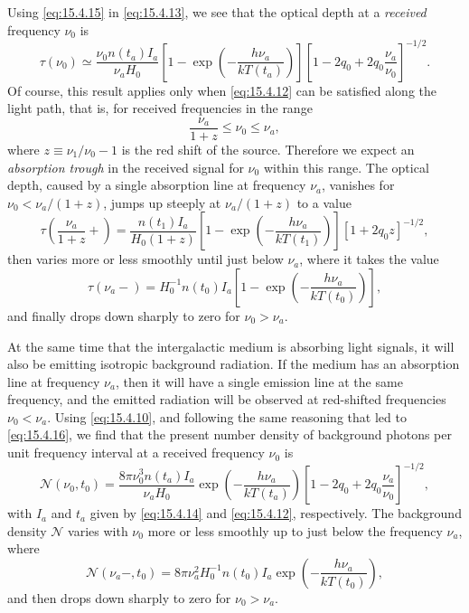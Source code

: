 Using \eqref{eq:15.4.15} in \eqref{eq:15.4.13}, we see that the optical
depth at a \emph{received} frequency \(\nu_0\) is
\begin{equation}
  \tau(\nu_0)
  \simeq
  \frac{\nu_0n(t_a)I_a}{\nu_aH_0}
  \left[
    1-\exp\left(-\frac{h\nu_a}{kT(t_a)}\right)
  \right]
  \left[
    1-2q_0+2q_0\frac{\nu_a}{\nu_0}
  \right]^{-1/2}.
  \tag{15.4.16}\label{eq:15.4.16}
\end{equation}
Of course, this result applies only when \eqref{eq:15.4.12} can be satisfied
along the light path, that is, for received frequencies in the range
\begin{equation}
  \frac{\nu_a}{1+z}\leq\nu_0\leq\nu_a,
  \tag{15.4.17}\label{eq:15.4.17}
\end{equation}
where \(z\equiv\nu_1/\nu_0-1\) is the red shift of the source. Therefore we
expect an \emph{absorption trough} in the received signal for \(\nu_0\) within
this range. The optical depth, caused by a single absorption line at frequency
\(\nu_a\), vanishes for \(\nu_0<\nu_a/(1+z)\), jumps up steeply at
\(\nu_a/(1+z)\) to a value
\begin{equation}
  \tau\left(\frac{\nu_a}{1+z}+\right)
  =
  \frac{n(t_1)I_a}{H_0(1+z)}
  \left[
    1-\exp\left(-\frac{h\nu_a}{kT(t_1)}\right)
  \right]
  [1+2q_0z]^{-1/2},
  \tag{15.4.18}\label{eq:15.4.18}
\end{equation}
then varies more or less smoothly until just below \(\nu_a\), where it takes
the value
\begin{equation}
  \tau(\nu_a-)
  =
  H_0^{-1}n(t_0)I_a
  \left[
    1-\exp\left(-\frac{h\nu_a}{kT(t_0)}\right)
  \right],
  \tag{15.4.19}\label{eq:15.4.19}
\end{equation}
and finally drops down sharply to zero for \(\nu_0>\nu_a\).

At the same time that the intergalactic medium is absorbing light signals, it
will also be emitting isotropic background radiation. If the medium has an
absorption line at frequency \(\nu_a\), then it will have a single emission line
at the same frequency, and the emitted radiation will be observed at
red-shifted frequencies \(\nu_0<\nu_a\). Using \eqref{eq:15.4.10}, and
following the same reasoning that led to \eqref{eq:15.4.16}, we find that the
present number density of background photons per unit frequency interval at a
received frequency \(\nu_0\) is
\begin{equation}
  \mathcal N(\nu_0,t_0)
  =
  \frac{8\pi\nu_0^3n(t_a)I_a}{\nu_aH_0}
  \exp\left(-\frac{h\nu_a}{kT(t_a)}\right)
  \left[
    1-2q_0+2q_0\frac{\nu_a}{\nu_0}
  \right]^{-1/2},
  \tag{15.4.20}\label{eq:15.4.20}
\end{equation}
with \(I_a\) and \(t_a\) given by \eqref{eq:15.4.14} and
\eqref{eq:15.4.12}, respectively. The background density \(\mathcal N\)
varies with \(\nu_0\) more or less smoothly up to just below the frequency
\(\nu_a\), where
\begin{equation}
  \mathcal N(\nu_a-,t_0)
  =
  8\pi\nu_a^2H_0^{-1}n(t_0)I_a
  \exp\left(-\frac{h\nu_a}{kT(t_0)}\right),
  \tag{15.4.21}\label{eq:15.4.21}
\end{equation}
and then drops down sharply to zero for \(\nu_0>\nu_a\).

